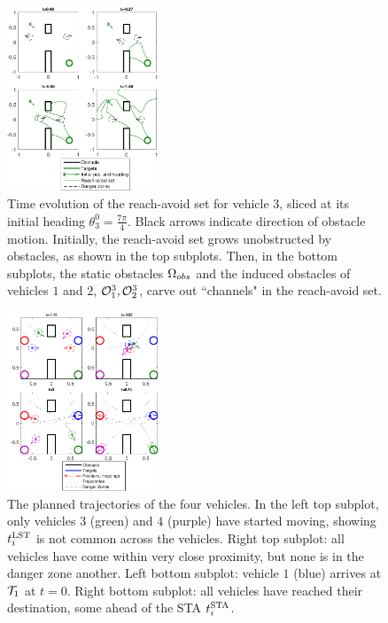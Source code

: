 \documentclass[letterpaper, 10pt, conference]{ieeeconf}      %
\begin{document}
\begin{figure}
	\centering
	\includegraphics[width=0.4\textwidth]{"dubins_reach_3"}
	\caption{Time evolution of the reach-avoid set for vehicle $3$, sliced at its initial heading $\theta_3^0=\frac{7\pi}{4}$. Black arrows indicate direction of obstacle motion. Initially, the reach-avoid set grows unobstructed by obstacles, as shown in the top subplots. Then, in the bottom subplots, the static obstacles $\Omega_{obs}$ and the induced obstacles of vehicles $1$ and $2$, $\mathcal{O}^3_1,\mathcal{O}^3_2$, carve out ``channels" in the reach-avoid set.}
	\label{fig:dubins_reach_3}
\end{figure}

\begin{figure}
	\centering
	\includegraphics[width=0.4\textwidth]{"dubins_result"}
	\caption{The planned trajectories of the four vehicles. In the left top subplot, only vehicles $3$ (green) and $4$ (purple) have started moving, showing $t^{\text{LST}}_i$ is not common across the vehicles. Right top subplot: all vehicles have come within very close proximity, but none is in the danger zone another. Left bottom subplot: vehicle $1$ (blue) arrives at $\mathcal{T}_1$ at $t=0$. Right bottom subplot: all vehicles have reached their destination, some ahead of the STA $t^{\text{STA}}_i$.}
	\label{fig:dubins_result}
\end{figure}
\end{document}
